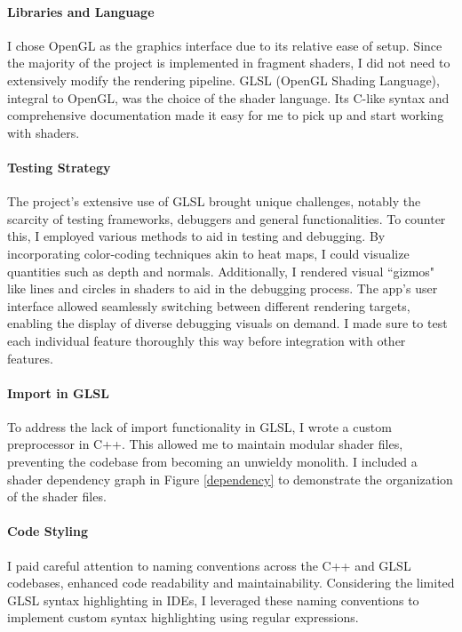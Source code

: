 
\paragraph{Libraries and Language}
I chose OpenGL as the graphics interface due to its relative ease of setup. Since the majority of the project is implemented in fragment shaders, I did not need to extensively modify the rendering pipeline. GLSL (OpenGL Shading Language), integral to OpenGL, was the choice of the shader language. Its C-like syntax and comprehensive documentation made it easy for me to pick up and start working with shaders.

\paragraph{Testing Strategy}
The project's extensive use of GLSL brought unique challenges, notably the scarcity of testing frameworks, debuggers and general functionalities. To counter this, I employed various methods to aid in testing and debugging. By incorporating color-coding techniques akin to heat maps, I could visualize quantities such as depth and normals. Additionally, I rendered visual ``gizmos" like lines and circles in shaders to aid in the debugging process. The app's user interface allowed seamlessly switching between different rendering targets, enabling the display of diverse debugging visuals on demand. I made sure to test each individual feature thoroughly this way before integration with other features.

\paragraph{Import in GLSL}
To address the lack of import functionality in GLSL, I wrote a custom preprocessor in C++. This allowed me to maintain modular shader files, preventing the codebase from becoming an unwieldy monolith. I included a shader dependency graph in Figure \ref{dependency} to demonstrate the organization of the shader files.

\paragraph{Code Styling}
I paid careful attention to naming conventions across the C++ and GLSL codebases, enhanced code readability and maintainability. Considering the limited GLSL syntax highlighting in IDEs, I leveraged these naming conventions to implement custom syntax highlighting using regular expressions.

